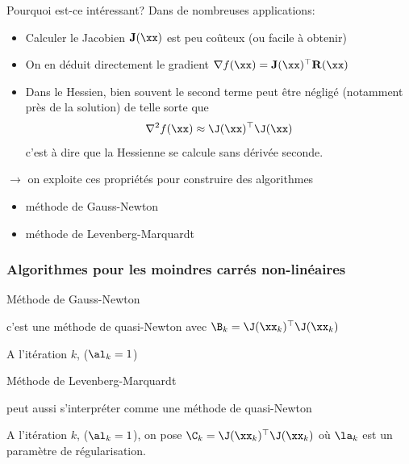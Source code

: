 \documentclass[9pt,table]{beamer} %
\begin{document}
\begin{frame}{Pourquoi est-ce intéressant?}
  Dans de nombreuses applications:
  \begin{itemize}[label=-]
    \item Calculer le Jacobien $\mathbf{J}(\xx)$ est \alert{peu coûteux} (ou facile à obtenir)
    \item On en déduit directement le gradient $ \nabla f(\xx) = \mathbf{J}(\xx)^\top \mathbf{R}(\xx)$
    \item Dans le Hessien, bien souvent le second terme peut être \alert{négligé} (notamment près de la solution) de telle sorte que 
    \[  \nabla^2 f(\xx) \approx \J(\xx)^\top\J(\xx)\]
    c'est à dire que la Hessienne se calcule \alert{sans dérivée seconde}.
  \end{itemize}
  \vfill 
  $\rightarrow$ on exploite ces propriétés pour construire des algorithmes
  \begin{itemize}[label=-]
    \item méthode de \alert{Gauss-Newton}
    \item méthode de \alert{Levenberg-Marquardt}
  \end{itemize}
\end{frame}



\begin{frame}
\frametitle{Algorithmes pour les moindres carrés non-linéaires}

\alert{Méthode de Gauss-Newton}
\begin{tcolorbox}
c'est une méthode de quasi-Newton avec $\B_k = \J(\xx_k)^\top\J(\xx_k)$

A l'itération $k$, ($\al_k = 1$)
\end{tcolorbox}

\bigbreak

\alert{Méthode de Levenberg-Marquardt}
\begin{tcolorbox}
peut aussi s'interpréter comme une méthode de quasi-Newton

A l'itération $k$, ($\al_k = 1$), on pose $\C_k = \J(\xx_k)^\top\J(\xx_k)$
où $\la_k$ est un paramètre de régularisation.
\end{tcolorbox}

\end{frame}
\end{document}
